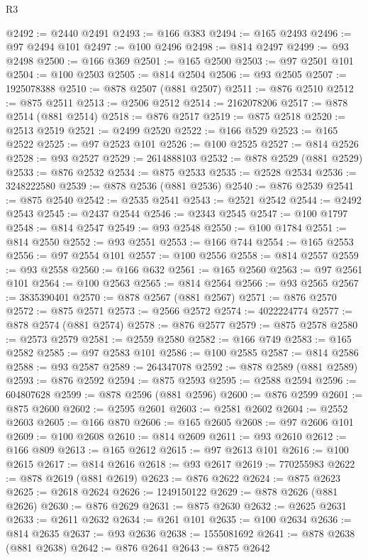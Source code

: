 \begin{lexlean}{R3}
\begin{coremodule}
@2492 := @2440 @2491
@2493 := @166 @383
@2494 := @165 @2493
@2496 := @97 @2494 @101
@2497 := @100 @2496
@2498 := @814 @2497
@2499 := @93 @2498
@2500 := @166 @369
@2501 := @165 @2500
@2503 := @97 @2501 @101
@2504 := @100 @2503
@2505 := @814 @2504
@2506 := @93 @2505
@2507 := 1925078388
@2510 := @878 @2507 (@881 @2507)
@2511 := @876 @2510
@2512 := @875 @2511
@2513 := @2506 @2512
@2514 := 2162078206
@2517 := @878 @2514 (@881 @2514)
@2518 := @876 @2517
@2519 := @875 @2518
@2520 := @2513 @2519
@2521 := @2499 @2520
@2522 := @166 @529
@2523 := @165 @2522
@2525 := @97 @2523 @101
@2526 := @100 @2525
@2527 := @814 @2526
@2528 := @93 @2527
@2529 := 2614888103
@2532 := @878 @2529 (@881 @2529)
@2533 := @876 @2532
@2534 := @875 @2533
@2535 := @2528 @2534
@2536 := 3248222580
@2539 := @878 @2536 (@881 @2536)
@2540 := @876 @2539
@2541 := @875 @2540
@2542 := @2535 @2541
@2543 := @2521 @2542
@2544 := @2492 @2543
@2545 := @2437 @2544
@2546 := @2343 @2545
@2547 := @100 @1797
@2548 := @814 @2547
@2549 := @93 @2548
@2550 := @100 @1784
@2551 := @814 @2550
@2552 := @93 @2551
@2553 := @166 @744
@2554 := @165 @2553
@2556 := @97 @2554 @101
@2557 := @100 @2556
@2558 := @814 @2557
@2559 := @93 @2558
@2560 := @166 @632
@2561 := @165 @2560
@2563 := @97 @2561 @101
@2564 := @100 @2563
@2565 := @814 @2564
@2566 := @93 @2565
@2567 := 3835390401
@2570 := @878 @2567 (@881 @2567)
@2571 := @876 @2570
@2572 := @875 @2571
@2573 := @2566 @2572
@2574 := 4022224774
@2577 := @878 @2574 (@881 @2574)
@2578 := @876 @2577
@2579 := @875 @2578
@2580 := @2573 @2579
@2581 := @2559 @2580
@2582 := @166 @749
@2583 := @165 @2582
@2585 := @97 @2583 @101
@2586 := @100 @2585
@2587 := @814 @2586
@2588 := @93 @2587
@2589 := 264347078
@2592 := @878 @2589 (@881 @2589)
@2593 := @876 @2592
@2594 := @875 @2593
@2595 := @2588 @2594
@2596 := 604807628
@2599 := @878 @2596 (@881 @2596)
@2600 := @876 @2599
@2601 := @875 @2600
@2602 := @2595 @2601
@2603 := @2581 @2602
@2604 := @2552 @2603
@2605 := @166 @870
@2606 := @165 @2605
@2608 := @97 @2606 @101
@2609 := @100 @2608
@2610 := @814 @2609
@2611 := @93 @2610
@2612 := @166 @809
@2613 := @165 @2612
@2615 := @97 @2613 @101
@2616 := @100 @2615
@2617 := @814 @2616
@2618 := @93 @2617
@2619 := 770255983
@2622 := @878 @2619 (@881 @2619)
@2623 := @876 @2622
@2624 := @875 @2623
@2625 := @2618 @2624
@2626 := 1249150122
@2629 := @878 @2626 (@881 @2626)
@2630 := @876 @2629
@2631 := @875 @2630
@2632 := @2625 @2631
@2633 := @2611 @2632
@2634 := @261 @101
@2635 := @100 @2634
@2636 := @814 @2635
@2637 := @93 @2636
@2638 := 1555081692
@2641 := @878 @2638 (@881 @2638)
@2642 := @876 @2641
@2643 := @875 @2642

\end{coremodule}
\end{lexlean}
